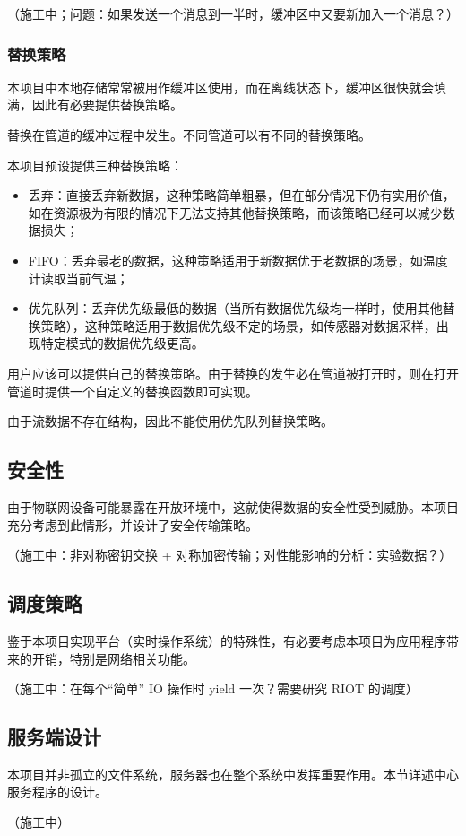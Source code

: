 \documentclass{ctexart}
\begin{document}
（施工中；问题：如果发送一个消息到一半时，缓冲区中又要新加入一个消息？）

\subsubsection{替换策略}
\label{design-replace}
本项目中本地存储常常被用作缓冲区使用，而在离线状态下，缓冲区很快就会填满，因此有必要提供替换策略。

替换在管道的缓冲过程中发生。不同管道可以有不同的替换策略。

本项目预设提供三种替换策略：
\begin{itemize}
	\item 丢弃：直接丢弃新数据，这种策略简单粗暴，但在部分情况下仍有实用价值，如在资源极为有限的情况下无法支持其他替换策略，而该策略已经可以减少数据损失；
	\item FIFO：丢弃最老的数据，这种策略适用于新数据优于老数据的场景，如温度计读取当前气温；
	\item 优先队列：丢弃优先级最低的数据（当所有数据优先级均一样时，使用其他替换策略），这种策略适用于数据优先级不定的场景，如传感器对数据采样，出现特定模式的数据优先级更高。
\end{itemize}
用户应该可以提供自己的替换策略。由于替换的发生必在管道被打开时，则在打开管道时提供一个自定义的替换函数即可实现。

由于流数据不存在结构，因此不能使用优先队列替换策略。

\subsection{安全性}
\label{design-security}
由于物联网设备可能暴露在开放环境中，这就使得数据的安全性受到威胁。本项目充分考虑到此情形，并设计了安全传输策略。

（施工中：非对称密钥交换 + 对称加密传输；对性能影响的分析：实验数据？）

\subsection{调度策略}
鉴于本项目实现平台（实时操作系统）的特殊性，有必要考虑本项目为应用程序带来的开销，特别是网络相关功能。

（施工中：在每个“简单” IO 操作时 yield 一次？需要研究 RIOT 的调度）

\subsection{服务端设计}
本项目并非孤立的文件系统，服务器也在整个系统中发挥重要作用。本节详述中心服务程序的设计。

（施工中）
\end{document}
